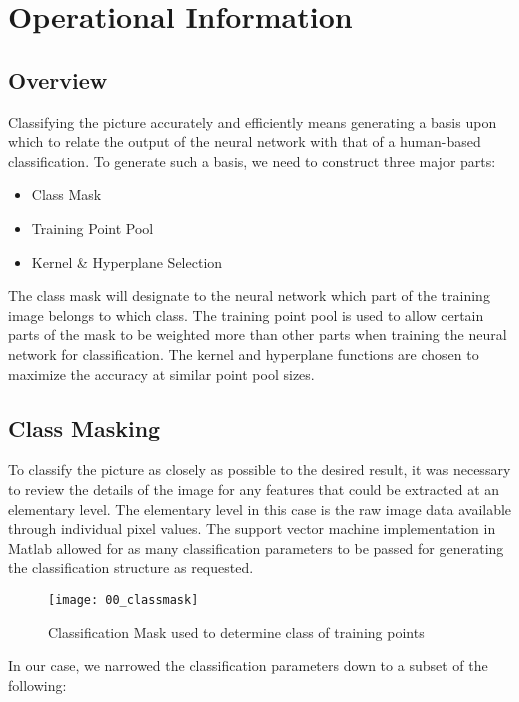 \chapter{Operational Information}

\section{Overview}
Classifying the picture accurately and efficiently means generating a basis upon which to relate the output of the neural network with that of a human-based classification. To generate such a basis, we need to construct three major parts:

\begin{itemize}
    \item Class Mask
    \item Training Point Pool
    \item Kernel \& Hyperplane Selection
\end{itemize}

The class mask will designate to the neural network which part of the training image belongs to which class. The training point pool is used to allow certain parts of the mask to be weighted more than other parts when training the neural network for classification. The kernel and hyperplane functions are chosen to maximize the accuracy at similar point pool sizes.

\section{Class Masking}

To classify the picture as closely as possible to the desired result, it was necessary to review the details of the image for any features that could be extracted at an elementary level. The elementary level in this case is the raw image data available through individual pixel values. The support vector machine implementation in Matlab allowed for as many classification parameters to be passed for generating the classification structure as requested. 

\begin{figure}[ht]
    \centering
    \texttt{[image: 00\_classmask]}
    \caption{Classification Mask used to determine class of training points}
    \label{fig:00_classmask}
\end{figure}

In our case, we narrowed the classification parameters down to a subset of the following:

